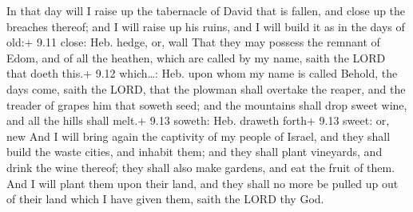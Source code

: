  In that day will I raise up the tabernacle of David that
is fallen, and close up the breaches thereof; and I will raise up his
ruins, and I will build it as in the days of old:+ 9.11 close: Heb.
hedge, or, wall  That they may possess the remnant of
Edom, and of all the heathen, which are called by my name, saith the
LORD that doeth this.+ 9.12 which\ldots: Heb. upon whom my name is
called  Behold, the days come, saith the LORD, that the
plowman shall overtake the reaper, and the treader of grapes him that
soweth seed; and the mountains shall drop sweet wine, and all the hills
shall melt.+ 9.13 soweth: Heb. draweth forth+ 9.13 sweet: or, new
 And I will bring again the captivity of my people of
Israel, and they shall build the waste cities, and inhabit them; and
they shall plant vineyards, and drink the wine thereof; they shall also
make gardens, and eat the fruit of them.  And I will
plant them upon their land, and they shall no more be pulled up out of
their land which I have given them, saith the LORD thy God.
